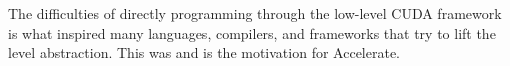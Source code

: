 The difficulties of directly programming through the low-level CUDA framework is what inspired many languages, compilers, and frameworks that try to lift the level abstraction. This was and is the motivation for Accelerate.



%






